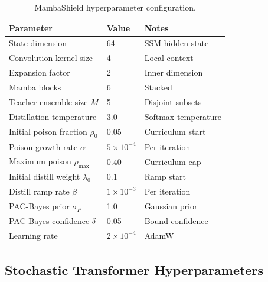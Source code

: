 \begin{table}[htbp]
\centering
\caption{MambaShield hyperparameter configuration.}
\label{tab:hp_mamba}
\begin{tabular}{lll}
\toprule
Parameter & Value & Notes \\
\midrule
State dimension            & 64    & SSM hidden state \\
Convolution kernel size    & 4     & Local context \\
Expansion factor           & 2     & Inner dimension \\
Mamba blocks               & 6     & Stacked \\
Teacher ensemble size $M$  & 5     & Disjoint subsets \\
Distillation temperature   & 3.0   & Softmax temperature \\
Initial poison fraction $\rho_0$ & 0.05 & Curriculum start \\
Poison growth rate $\alpha$ & $5\times10^{-4}$ & Per iteration \\
Maximum poison $\rho_{\max}$ & 0.40 & Curriculum cap \\
Initial distill weight $\lambda_0$ & 0.1 & Ramp start \\
Distill ramp rate $\beta$  & $1\times10^{-3}$ & Per iteration \\
PAC-Bayes prior $\sigma_P$ & 1.0   & Gaussian prior \\
PAC-Bayes confidence $\delta$ & 0.05 & Bound confidence \\
Learning rate              & $2\times10^{-4}$ & AdamW \\
\bottomrule
\end{tabular}
\end{table}


\subsection{Stochastic Transformer Hyperparameters}
\label{app:hp_stochastic}

